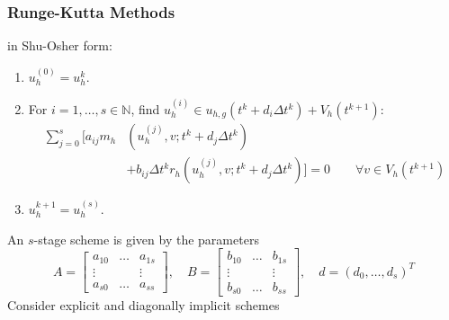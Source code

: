 \documentclass[aspectratio=169,11pt]{beamer}
\theoremstyle{definition}
\begin{document}
\begin{frame}
\frametitle{Runge-Kutta Methods}
in Shu-Osher form:
\begin{enumerate}
\item $u_h^{(0)} = u_h^{k}$.
\item For $i=1,\ldots,s\in\mathbb{N}$, find $u_h^{(i)}\in u_{h,g}(t^k+d_i \Delta t^k)
+ V_h(t^{k+1})$:
\begin{equation*}
\begin{split}
\sum\limits_{j=0}^{s} \bigl[a_{ij} m_h&\left(u_h^{(j)},v;t^k+d_j \Delta t^k\right) \\
&+ b_{ij} \Delta t^k r_h\left(u_h^{(j)}, v;t^k+d_j \Delta t^k\right) \bigr] = 0
\qquad \forall v\in V_h(t^{k+1})
\end{split}
\end{equation*}
\item $u_h^{k+1} = u_h^{(s)}$.
\end{enumerate}
An $s$-stage scheme is given by the parameters
\begin{equation*}
A = \left[\begin{array}{ccc}
a_{10} & \ldots & a_{1s}\\
\vdots &  & \vdots\\
a_{s0} & \ldots & a_{ss}
\end{array}\right],
\quad B = \left[\begin{array}{ccc}
b_{10} & \ldots & b_{1s}\\
\vdots &  & \vdots\\
b_{s0} & \ldots & b_{ss}
\end{array}\right],
\quad d = \left(
d_{0}, \ldots, d_{s}
\right)^T
\end{equation*}
Consider explicit and diagonally implicit schemes
\end{frame}
\end{document}

